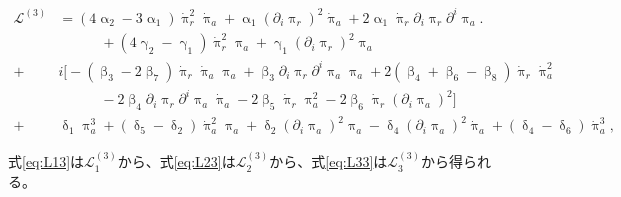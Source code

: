 \documentclass[a4paper,11pt]{ltjsarticle}
\numberwithin{equation}{section}
\begin{document}
\begin{tcolorbox}[enhanced,breakable,skin first=enhanced,skin middle=enhanced,skin last=enhanced,before upper={\parindent15pt},]{}
\begin{align}
    \mathcal{L}^{(3)} &= \left(4 \upalpha_2 -3\upalpha_1 \right) \dot{\uppi}^2_{r} \dot{\uppi}_{a} + \upalpha_1 \left(\partial_i \uppi_{r} \right)^2 \dot{\uppi}_a + 2 \upalpha_1  \dot{\uppi}_{r}	\partial_i \uppi_{r}  \partial^i \uppi_{a} \Big. \label{eq:L13} \\
    &\qquad \quad + \left(4 \upgamma_2 -\upgamma_1 \right)  \dot{\uppi}^2_{r} \uppi_{a}	+ \upgamma_1 	\left(\partial_i \uppi_{r} \right)^2 \uppi_a \nonumber \\ 
    +&i \Big[-(\upbeta_3 -2 \upbeta_7)\dot{\uppi}_{r} \dot{\uppi}_{a} \uppi_a + \upbeta_3 \partial_i \uppi_{r}  \partial^i \uppi_{a} \uppi_a +2 (\upbeta_4+\upbeta_6 - \upbeta_8) \dot{\uppi}_{r} \dot{\uppi}_a^2 \label{eq:L23} \\
    & \qquad \quad - 2 \upbeta_4   \partial_i \uppi_{r}  \partial^i \uppi_{a} \dot{\uppi}_{a} - 2\upbeta_5 \dot{\uppi}_{r} \uppi_a^2  - 2 \upbeta_6 \dot{\uppi}_{r}(\partial_i\uppi_a)^2\Big] \nonumber \\
    +&\updelta_1 \uppi_a^3 + (\updelta_5- \updelta_2)  \dot{\uppi}_{a}^2 \uppi_a  + \updelta_2  (\partial_i \uppi_{a})^2 \uppi_a - \updelta_4  (\partial_i \uppi_{a})^2 \dot{\uppi}_a + (\updelta_4-\updelta_6)\dot{\uppi}_{a}^3, \label{eq:L33}
\end{align}

式\ref{eq:L13}は$\mathcal{L}_1^{(3)}$から、式\ref{eq:L23}は$\mathcal{L}_2^{(3)}$から、式\ref{eq:L33}は$\mathcal{L}_3^{(3)}$から得られる。

\end{tcolorbox}
\end{document}
